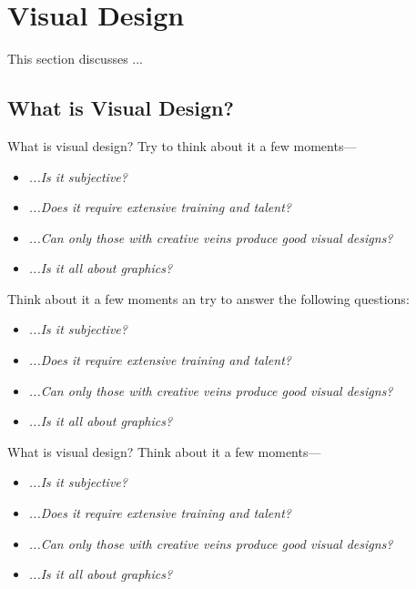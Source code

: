 
\section{Visual Design} %
\label{sec:visual_design}
This section discusses ...

\subsection{What is Visual Design?} %
\label{sub:what_is_visual_design}

What is visual design? Try to think about it a few moments---
\begin{itemize}[]
	\item \emph{...Is it subjective?}
	\item \emph{...Does it require extensive training and talent?}
	\item \emph{...Can only those with creative veins produce good visual designs?}
	\item \emph{...Is it all about graphics?}
\end{itemize}  


\begin{tcolorbox}[
	width=\textwidth,
	title={\textbf{What is Visual Design?}},
	outer arc=0mm,
	arc=0mm,
	boxrule=1pt,
	]    
Think about it a few moments an try to answer the following questions:
\begin{itemize}[]
	\item \emph{...Is it subjective?}
	\item \emph{...Does it require extensive training and talent?}
	\item \emph{...Can only those with creative veins produce good visual designs?}
	\item \emph{...Is it all about graphics?}
\end{itemize} 
\end{tcolorbox}   


\begin{tcolorbox}[boxsep=0.5em,
                  left=0.5em,
                  right=0pt,
                  top=0pt,
				  outer arc=0mm,
                  arc=0mm,
                  boxrule=0.0pt,leftrule=3pt,
                  colback=exampleback,
				  colframe=examplerule
                  ]%
What is visual design? Think about it a few moments---
\begin{itemize}[]
	\item \emph{...Is it subjective?}
	\item \emph{...Does it require extensive training and talent?}
	\item \emph{...Can only those with creative veins produce good visual designs?}
	\item \emph{...Is it all about graphics?}
\end{itemize} 
\end{tcolorbox}

